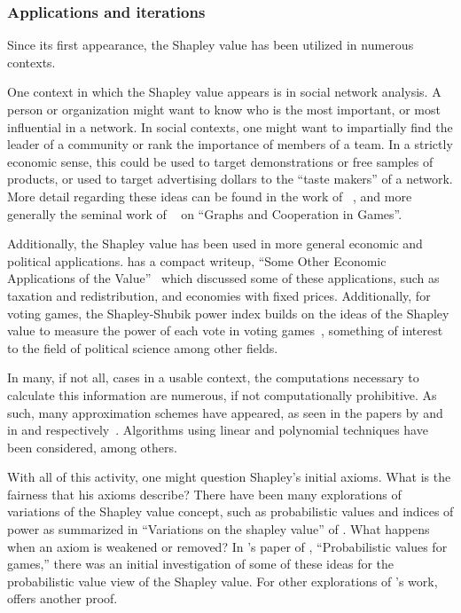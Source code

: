 \documentclass[12pt,letterpaper,final]{article}
\theoremstyle{plain}
\theoremstyle{plain}
\theoremstyle{plain}
\theoremstyle{plain}
\theoremstyle{plain}
\theoremstyle{plain}
\theoremstyle{plain}
\theoremstyle{definition}
\theoremstyle{definition}
\theoremstyle{definition}
\theoremstyle{definition}
\theoremstyle{definition}
\theoremstyle{remark}
\theoremstyle{remark}
\theoremstyle{remark}
\theoremstyle{remark}
\begin{document}
\subsubsection{Applications and iterations}
Since its first appearance, the Shapley value has been utilized in
numerous contexts.

One context in which the Shapley value appears is in social network
analysis. A person or organization might want to know who is the most important, or most
influential in a network.
In social contexts, one might want to impartially find the leader of a
community or rank the importance of members of a team.
In a strictly economic sense, this could be used to target demonstrations
or free samples of products, or used to target
advertising dollars to the ``taste makers'' of a network. More detail
regarding these ideas can be found in the work of
\citeauthor{GGMOPT03,NaNa11, PaGi11}~\cite{GGMOPT03,NaNa11, PaGi11},
and more generally the seminal work of
\citeauthor{Myerson77}~\cite{Myerson77} on ``Graphs and Cooperation in Games''.

Additionally, the Shapley value has been used in more general economic and political
applications. \citeauthor{Mertens02} has a compact
writeup, ``Some Other Economic Applications of the Value''~\cite{Mertens02} which discussed some
of these applications, such as taxation and redistribution, and
economies with fixed prices. Additionally, for voting games, the
Shapley-Shubik power index builds on the ideas of the Shapley value to
measure the power of each vote in voting games~\cite{ShaShu54},
something of interest to the field of political science among other fields. 

In many, if not all, cases in a usable context, the computations
necessary to calculate this information are
numerous, if not computationally prohibitive. As such, many
approximation schemes have appeared, as seen in the
papers by \citeauthor{Owen72,Fatima08} and \citeauthor{Castro09} in
\citeyear{Owen72,Fatima08} and \citeyear{Castro09}
respectively~\cite{Owen72,Fatima08,Castro09}. Algorithms
using linear and polynomial techniques have been considered, among others.

With all of this activity, one might question Shapley's initial
axioms. What is the fairness that his axioms describe? There have been
many explorations of variations of the Shapley 
value concept, such as probabilistic values and indices of power  as
summarized in ``Variations on the shapley value'' of \citeauthor{MonSam02}
\cite{MonSam02}. What happens when an axiom is weakened or removed? In
\citeauthor{Weber78}'s paper of \citeyear{Weber78},
``Probabilistic values for games,'' there was an initial investigation of some of
these ideas for the probabilistic value view of the Shapley value.
For other explorations of \citeauthor{Weber78}'s work,
\citeauthor{Derks05} \cite{Derks05} offers another proof.
\end{document}
